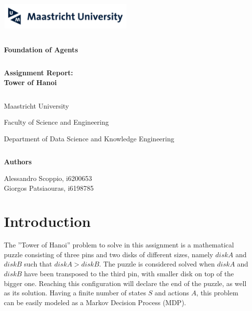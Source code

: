 \documentclass[11pt]{article}
\numberwithin{equation}{section}
\numberwithin{table}{section}
\numberwithin{figure}{section}
\begin{document}
	
	\newpage
	\thispagestyle{empty}
	
	{\includegraphics[width=0.5\textwidth,keepaspectratio]{um.png}\\
		
		\begin{verbatim}
		\end{verbatim}
		
		\begin{center}
			
			\huge{\textbf{Foundation of Agents}}
			
		\end{center}
		
		\begin{verbatim}
		\end{verbatim}
		
		\begin{center}
			\Large{\textbf{Assignment Report:\\ Tower of Hanoi}}
			\begin{verbatim}
			\end{verbatim}
			\Large{Maastricht University}
			\par
			\Large{Faculty of Science and Engineering}
			\par
			\Large{Department of Data Science and Knowledge Engineering}
			\begin{verbatim}
			\end{verbatim}
			\Large{\textbf{Authors}}\par
			\Large{Alessandro Scoppio, i6200653\\
				Giorgos Patsiaouras, i6198785}
			\par    	
		\end{center}
		\newpage
    \setcounter{page}{1}
		\section{Introduction}
		\label{sec_Methodology}
		The ''Tower of Hanoi'' problem to solve in this assignment is a mathematical puzzle consisting of three pins and two disks of different sizes, namely  $disk A$ and $disk B$ such that $disk A > disk B$.
		The puzzle is considered solved when $disk A$ and $disk B$ have been transposed to the third pin, with smaller disk on top of the bigger one. Reaching this configuration will declare the end of the puzzle, as well as its solution. Having a finite number of states $S$ and actions $A$, this problem can be easily modeled as a Markov Decision Process (MDP).
		

}
\end{document}

